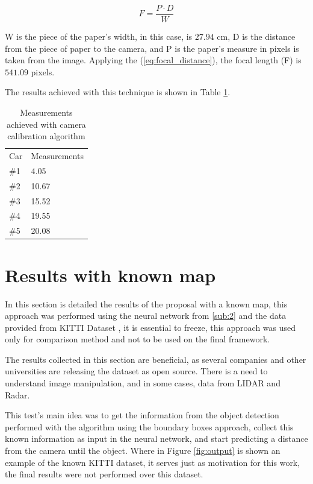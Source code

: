 \begin{equation}
    \label{eq:focal_distance}
    F = \frac{P\cdot D}{W}
\end{equation}

W is the piece of the paper's width, in this case, is $27.94$ cm, D is the distance from the piece of paper to the camera, and P is the paper's measure in pixels is taken from the image. Applying the (\ref{eq:focal_distance}), the focal length (F) is $541.09$ pixels.





The results achieved with this technique is shown in Table \ref{tab:output_calibrate}. 

\begin{table}[H]
\centering
\caption{Measurements achieved with camera calibration algorithm}
\begin{tabular}{l|l} 
\toprule
Car &  Measurements      \\
\#1   & 4.05        \\
\#2   & 10.67       \\
\#3   & 15.52       \\
\#4   & 19.55       \\
\#5   & 20.08       \\
\bottomrule
\end{tabular}
\label{tab:output_calibrate}
\end{table} 



\section{Results with known map}
In this section is detailed the results of the proposal with a known map, this approach was performed using the neural network from \ref{sub:2} and the data provided from KITTI Dataset \cite{geiger2013vision}, it is essential to freeze, this approach was used only for comparison method and not to be used on the final framework. 


The results collected in this section are beneficial, as several companies and other universities are releasing the dataset as open source. There is a need to understand image manipulation, and in some cases, data from LIDAR and Radar.

This test's main idea was to get the information from the object detection performed with the algorithm using the boundary boxes approach, collect this known information as input in the neural network, and start predicting a distance from the camera until the object. Where in Figure \ref{fig:output} is shown an example of the known KITTI dataset, it serves just as motivation for this work, the final results were not performed over this dataset. 


